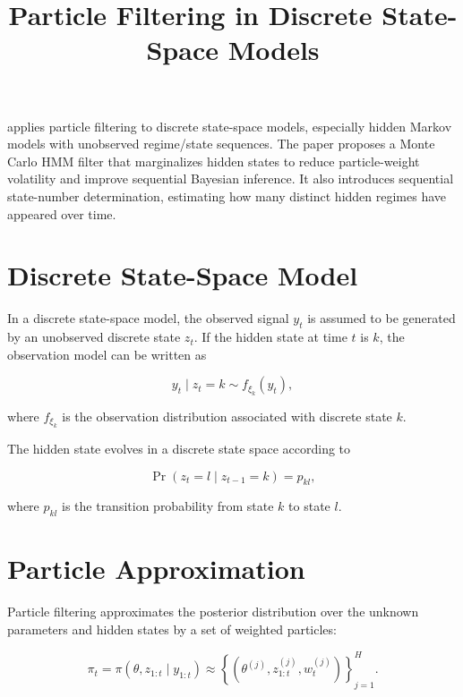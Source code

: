 \documentclass[a4paper]{article}
\title{Particle Filtering in Discrete State-Space Models}
\date{}
\begin{document}
    \maketitle
    
    \cite{chopin-2001-sequential-inference-and-state-number-determination-for-discrete-state-space-models-through-particle-filtering} applies particle filtering to discrete state-space models, especially hidden Markov models with unobserved regime/state sequences. The paper proposes a Monte Carlo HMM filter that marginalizes hidden states to reduce particle-weight volatility and improve sequential Bayesian inference. It also introduces sequential state-number determination, estimating how many distinct hidden regimes have appeared over time.
    
    
    \section{Discrete State-Space Model}
        
        In a discrete state-space model, the observed signal \(y_t\) is assumed to be generated by an unobserved discrete state \(z_t\). If the hidden state at time \(t\) is \(k\), the observation model can be written as
        
        \[
            y_t
            \mid
            z_t = k
            \sim
            f_{\xi_k}(y_t),
        \]
        
        where \(f_{\xi_k}\) is the observation distribution associated with discrete state \(k\).
        
        The hidden state evolves in a discrete state space according to
        
        \[
            \Pr
            \left(
                z_t = l
                \mid
                z_{t-1} = k
            \right)
            =
            p_{kl},
        \]
        
        where \(p_{kl}\) is the transition probability from state \(k\) to state \(l\).
    
    
    \section{Particle Approximation}
        
        Particle filtering approximates the posterior distribution over the unknown parameters and hidden states by a set of weighted particles:
        
        \[
            \pi_t
            =
            \pi
            \left(
                \theta,
            z_{1:t}
                \mid
                y_{1:t}
            \right)
            \approx
            \left\{
                \left(
                    \theta^{(j)},
                z_{1:t}^{(j)},
                w_t^{(j)}
                \right)
            \right\}_{j=1}^{H}.
        \]
        
\end{document}
